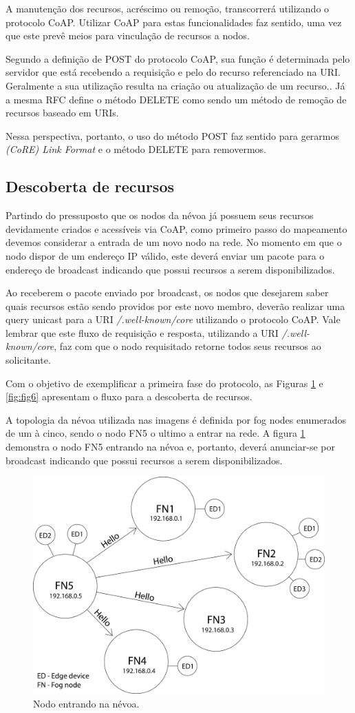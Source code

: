 A manutenção dos recursos, acréscimo ou remoção, transcorrerá utilizando o protocolo CoAP.
Utilizar CoAP para estas funcionalidades faz sentido, uma vez que este prevê meios para vinculação de recursos a nodos.

Segundo a definição de POST do protocolo CoAP, sua função é determinada pelo servidor que está recebendo a requisição e pelo do recurso referenciado na URI.
Geralmente a sua utilização resulta na criação ou atualização de um recurso.\cite{rfc7252}.
Já a mesma RFC define o método DELETE como sendo um método de remoção de recursos baseado em URIs\cite{rfc7252}.

Nessa perspectiva, portanto, o uso do método POST faz sentido para gerarmos \textit{(CoRE) Link Format} e o método DELETE para removermos.


\subsection{Descoberta de recursos}


Partindo do pressuposto que os nodos da névoa já possuem seus recursos devidamente criados e acessíveis via CoAP,
como primeiro passo do mapeamento devemos considerar a entrada de um novo nodo na rede.
No momento em que o nodo dispor de um endereço IP válido, este deverá enviar um pacote para o endereço de broadcast indicando que possui recursos a serem disponibilizados.


Ao receberem o pacote enviado por broadcast, os nodos que desejarem saber quais recursos estão sendo providos por este novo membro, deverão realizar uma query
unicast para a URI \textit{/.well-known/core} utilizando o protocolo CoAP.
Vale lembrar que este fluxo de requisição e resposta, utilizando a URI \textit{/.well-known/core}, faz com que o nodo requisitado retorne todos seus recursos ao solicitante.


Com o objetivo de exemplificar a primeira fase do protocolo, as Figuras \ref{fig:fig5} e \ref{fig:fig6} apresentam o fluxo para a descoberta de recursos.

A topologia da névoa utilizada nas imagens é definida por fog nodes enumerados de um à cinco, sendo o nodo FN5 o ultimo a entrar na rede.
A figura \ref{fig:fig5} demonstra o nodo FN5 entrando na névoa e, portanto, deverá anunciar-se por broadcast indicando que possui recursos a serem disponibilizados.

\begin{figure}[htb!]
    \centering\includegraphics[width=.5\textwidth]{fig5.png}
    \caption%
    {\label{fig:fig5} Nodo entrando na névoa.}
\end{figure}

